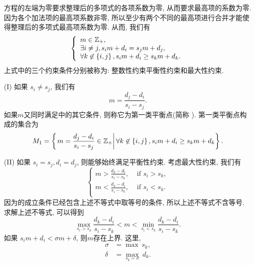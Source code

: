 方程的左端为零要求整理后的多项式的各项系数为零, 从而要求最高项的系数为零. 因为各个加法项的最高项系数非零, 所以至少有两个不同的最高项进行合并才能使得整理后的多项式最高项系数为零. 从而, 我们有 
\begin{equation}
\left\{
\begin{array}{l}
m\in \mathbb Z_+  ,                                     \\
\exists i\neq j, s_i m+d_i=s_j m+d_j    ,               \\
\forall k \not\in \left\{i,j\right\}, s_i m+d_i\ge s_k m+d_k .
\end{array}
\right.
\label{cond}
\end{equation}
上式中的三个约束条件分别被称为: 整数性约束\D 平衡性约束和最大性约束. 

(I) 如果 $s_i \neq s_j$, 我们有 
\begin{equation}
m=\frac{d_j-d_i}{s_i-s_j}.
\end{equation}
如果$m$又同时满足中的其它条件, 则称它为第一类平衡点(简称 \BPone{}). 第一类平衡点构成的集合为 
\begin{equation}
M_1=\left\{\left. m=\frac{d_j-d_i}{s_i-s_j}\in \mathbb Z_+\right\vert \forall k\not\in \left\{i,j\right\}, s_i m+d_i\ge s_k m+d_k\right\}.
\end{equation}

(II) 如果 $s_i = s_j, d_i=d_j$, 则能够始终满足平衡性约束. 考虑最大性约束, 我们有 
\begin{equation}
\left\{
\begin{split}
m > \frac{d_k-d_i}{s_i-s_k}, & \text{ if } s_i>s_k,  \\
m < \frac{d_k-d_i}{s_i-s_k}, & \text{ if } s_i<s_k.  \\
\end{split}
\right.
\end{equation}
因为\BPone{}的成立条件已经包含上述不等式中取等号的条件, 所以上述不等式不含等号. 求解上述不等式, 可以得到 
\begin{equation}
\underset{s_i>s_k}{\max}{\frac{d_k-d_i}{s_i-s_k}} < m < \underset{s_i<s_k}{\min}{\frac{d_k-d_i}{s_i-s_k}}.
\end{equation}
如果 $s_i m + d_i < \sigma m + \delta$, 则$m$存在上界. 这里, 
\begin{equation}
\begin{split}
\sigma &= \max ~s_k,  \\
\delta &= \underset{s_k=\sigma}{\max}{~d_k}.
\end{split}
\label{eq-max-sd}
\end{equation}

